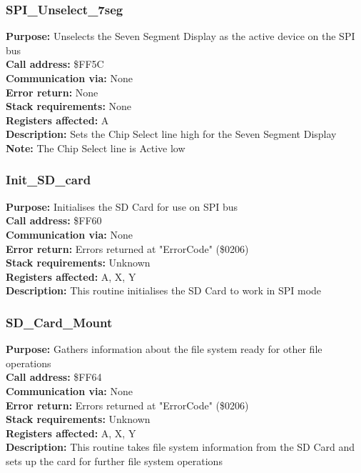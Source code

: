 \pagebreak

\subsubsection{SPI\_Unselect\_7seg}
\textbf{Purpose:} Unselects the Seven Segment Display as the active device on the SPI bus\\
\textbf{Call address:} \$FF5C\\
\textbf{Communication via:} None\\
\textbf{Error return:} None\\
\textbf{Stack requirements:} None\\
\textbf{Registers affected:} A\\
\textbf{Description:} Sets the Chip Select line high for the Seven Segment Display\\
\textbf{Note:} The Chip Select line is Active low\\ 


\subsubsection{Init\_SD\_card}
\textbf{Purpose:} Initialises the SD Card for use on SPI bus\\
\textbf{Call address:} \$FF60\\
\textbf{Communication via:} None\\
\textbf{Error return:} Errors returned at "ErrorCode" (\$0206)\\
\textbf{Stack requirements:} Unknown\\
\textbf{Registers affected:} A, X, Y\\
\textbf{Description:} This routine initialises the SD Card to work in SPI mode\\


\subsubsection{SD\_Card\_Mount}
\textbf{Purpose:} Gathers information about the file system ready for other file operations\\
\textbf{Call address:} \$FF64\\
\textbf{Communication via:} None\\
\textbf{Error return:} Errors returned at "ErrorCode" (\$0206)\\
\textbf{Stack requirements:} Unknown\\
\textbf{Registers affected:} A, X, Y\\
\textbf{Description:} This routine takes file system information from the SD Card and sets up the card for further file system operations\\

